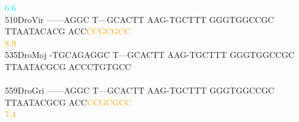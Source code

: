 \documentclass[11pt,twoside,reqno,a4paper]{article}
\begin{document}
{\hspace*{4\charwidth}\hspace*{7\charwidth}\hspace*{1\charwidth}\hspace*{1\charwidth}\hspace*{1\charwidth}\hspace*{36\charwidth}\textcolor{cyan}{6.6}\hspace*{1\charwidth}\hspace*{1\charwidth}\hspace*{1\charwidth}\\
510\hspace*{1\charwidth}DroVir	------AGGC	T---GCACTT	AAG-TGCTTT	GGGTGGCCGC	TTAATACACG	ACC\textcolor{orange}{C}\textcolor{orange}{C}\textcolor{orange}{G}\textcolor{orange}{C}\textcolor{orange}{G}\textcolor{orange}{C}\textcolor{orange}{C}	\\
\hspace*{4\charwidth}\hspace*{7\charwidth}\hspace*{1\charwidth}\hspace*{1\charwidth}\hspace*{1\charwidth}\hspace*{1\charwidth}\hspace*{1\charwidth}\hspace*{53\charwidth}\textcolor{orange}{8.9}\hspace*{1\charwidth}\\
535\hspace*{1\charwidth}DroMoj	-TGCAGAGGC	T---GCACTT	AAG-TGCTTT	GGGTGGCCGC	TTAATACGCG	ACCCTGTGCC	\\
\hspace*{4\charwidth}\hspace*{7\charwidth}\hspace*{1\charwidth}\hspace*{1\charwidth}\hspace*{1\charwidth}\hspace*{1\charwidth}\hspace*{1\charwidth}\hspace*{1\charwidth}\\
559\hspace*{1\charwidth}DroGri	------AGGC	T---GCACTT	AAG-TGCTTT	GGGTGGCCGC	TTAATACGCG	ACC\textcolor{orange}{C}\textcolor{orange}{C}\textcolor{orange}{G}\textcolor{orange}{C}\textcolor{orange}{G}\textcolor{orange}{C}\textcolor{orange}{C}	\\
\hspace*{4\charwidth}\hspace*{7\charwidth}\hspace*{1\charwidth}\hspace*{1\charwidth}\hspace*{1\charwidth}\hspace*{1\charwidth}\hspace*{1\charwidth}\hspace*{53\charwidth}\textcolor{orange}{7.4}\hspace*{1\charwidth}\\
}
\end{document}
